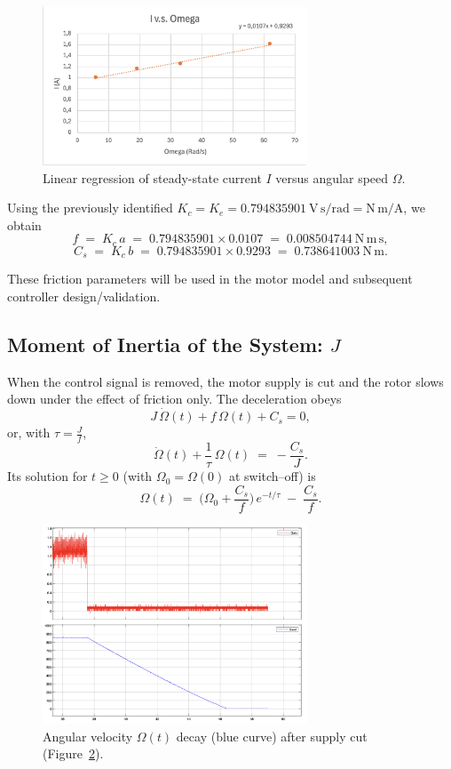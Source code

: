 \documentclass{rapportCS}
\begin{document}
\begin{figure}[H]
\centering
\includegraphics[width=0.7\textwidth]{figures/graph_i_omega.png}
\caption{Linear regression of steady-state current $I$ versus angular speed $\Omega$.}
\label{fig:i_omega}
\end{figure}

Using the previously identified $K_c = K_e = 0.794835901~\mathrm{V\,s/rad} = \mathrm{N\,m/A}$, we obtain
\[
f \;=\; K_c\,a \;=\; 0.794835901 \times 0.0107 \;=\; \mathbf{0.008504744}~\mathrm{N\,m\,s},
\]
\[
C_s \;=\; K_c\,b \;=\; 0.794835901 \times 0.9293 \;=\; \mathbf{0.738641003}~\mathrm{N\,m}.
\]

These friction parameters will be used in the motor model and subsequent controller design/validation.

\subsection{Moment of Inertia of the System: $J$}

When the control signal is removed, the motor supply is cut and the rotor slows down under the effect of friction only. The deceleration obeys
\[
J\,\dot{\Omega}(t) + f\,\Omega(t) + C_s = 0,
\]
or, with $\tau=\tfrac{J}{f}$,
\[
\dot{\Omega}(t) + \frac{1}{\tau}\,\Omega(t) \;=\; -\frac{C_s}{J}.
\]
Its solution for $t\ge 0$ (with $\Omega_0=\Omega(0)$ at switch--off) is
\[
\Omega(t) \;=\; \Big(\Omega_0 + \frac{C_s}{f}\Big)\,e^{-t/\tau} \;-\; \frac{C_s}{f}.
\tag{*}
\]

\begin{figure}[H]
\centering
\includegraphics[width=0.7\textwidth]{figures/signal_removed.png}
\caption{Angular velocity $\Omega(t)$ decay (blue curve) after supply cut (Figure~\ref{fig:J_measurement}).}
\label{fig:J_measurement}
\end{figure}
\end{document}
